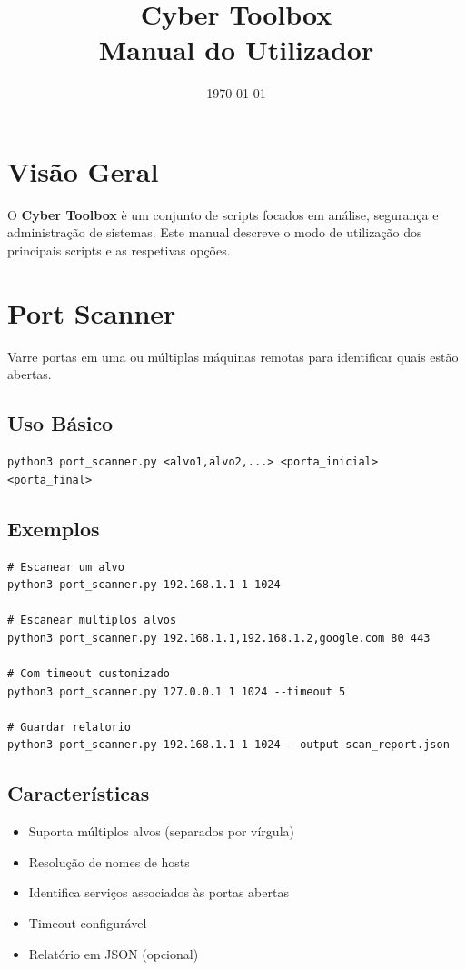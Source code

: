 \documentclass[11pt,a4paper]{article}
\title{Cyber Toolbox \\ Manual do Utilizador}
\author{}
\date{\today}
\begin{document}
\maketitle
\tableofcontents
\newpage

\section{Vis\~ao Geral}
O \textbf{Cyber Toolbox} \`e um conjunto de scripts focados em an\'alise, seguran\c{c}a e administra\c{c}\~ao de sistemas. Este manual descreve o modo de utiliza\c{c}\~ao dos principais scripts e as respetivas op\c{c}\~oes.

\section{Port Scanner}
Varre portas em uma ou m\'ultiplas m\'aquinas remotas para identificar quais est\~ao abertas.

\subsection{Uso B\'asico}
\begin{lstlisting}[style=bash]
python3 port_scanner.py <alvo1,alvo2,...> <porta_inicial> <porta_final>
\end{lstlisting}

\subsection{Exemplos}
\begin{lstlisting}[style=bash]
# Escanear um alvo
python3 port_scanner.py 192.168.1.1 1 1024

# Escanear multiplos alvos
python3 port_scanner.py 192.168.1.1,192.168.1.2,google.com 80 443

# Com timeout customizado
python3 port_scanner.py 127.0.0.1 1 1024 --timeout 5

# Guardar relatorio
python3 port_scanner.py 192.168.1.1 1 1024 --output scan_report.json
\end{lstlisting}

\subsection{Caracter\'isticas}
\begin{itemize}
  \item Suporta m\'ultiplos alvos (separados por v\'irgula)
  \item Resolu\c{c}\~ao de nomes de hosts
  \item Identifica servi\c{c}os associados \`as portas abertas
  \item Timeout configur\'avel
  \item Relat\'orio em JSON (opcional)
\end{itemize}
\end{document}
